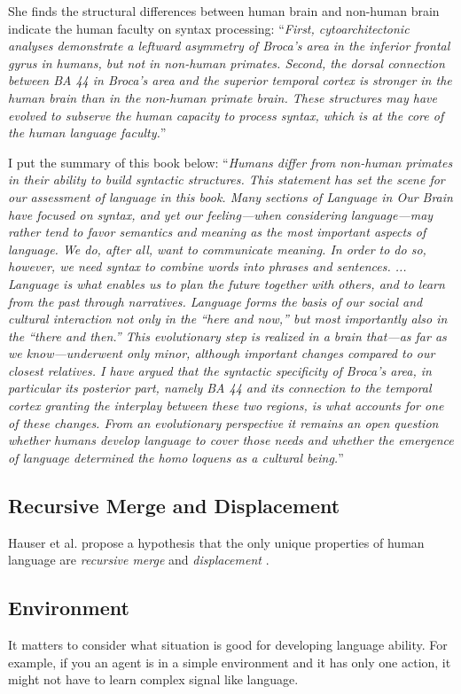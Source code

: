 \documentclass[12pt]{article}
\begin{document}
She finds the structural differences between human brain and non-human brain indicate the human 
faculty on syntax processing: ``\textit{First, cytoarchitectonic analyses demonstrate a leftward asymmetry
of Broca’s area in the inferior frontal gyrus in humans, but not in non-human primates.
Second, the dorsal connection between BA 44 in Broca’s area and the superior temporal
cortex is stronger in the human brain than in the non-human primate brain. These structures may have 
evolved to subserve the human capacity to process syntax, which is at the core of the human language faculty.}''

I put the summary of this book below: ``\textit{Humans differ from non-human primates in their ability to build syntactic structures. This
statement has set the scene for our assessment of language in this book. Many sections of
Language in Our Brain have focused on syntax, and yet our feeling—when considering
language—may rather tend to favor semantics and meaning as the most important aspects
of language. We do, after all, want to communicate meaning. In order to do so, however,
we need syntax to combine words into phrases and sentences. ... 
Language is what enables us to plan the future together with others, and to learn from the
past through narratives. Language forms the basis of our social and cultural interaction not
only in the “here and now,” but most importantly also in the “there and then.”
This evolutionary step is realized in a brain that—as far as we know—underwent only
minor, although important changes compared to our closest relatives. I have argued that
the syntactic specificity of Broca’s area, in particular its posterior part, namely BA 44 and
its connection to the temporal cortex granting the interplay between these two regions, is
what accounts for one of these changes. From an evolutionary perspective it remains an
open question whether humans develop language to cover those needs and whether the
emergence of language determined the homo loquens as a cultural being.}''

\subsection{Recursive Merge and Displacement}
Hauser et al. propose a hypothesis that the only unique properties of human language are 
\textit{recursive merge } and \textit{displacement} \cite{Hauser02}.

\subsection{Environment}
It matters to consider what situation is good for developing language ability. For 
example, if you an agent is in a simple environment and it has only one action, it 
might not have to learn complex signal like language.
\end{document}
